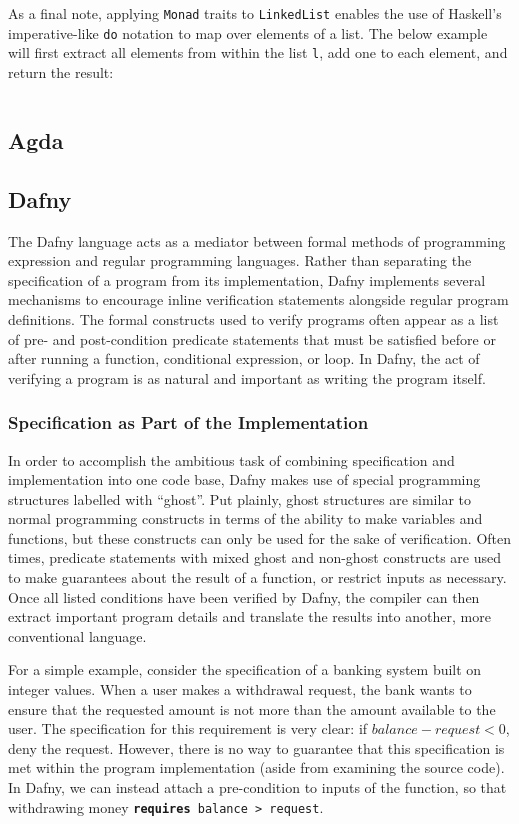 \documentclass{article}
\begin{document}
As a final note, applying \texttt{Monad} traits to \texttt{LinkedList} enables the use of Haskell's imperative-like
\texttt{do} notation to map over elements of a list. The below example will first extract all elements from within
the list \texttt{l}, add one to each element, and return the result:
\inputminted{haskell}{linked_list/main_2.hs}


\subsection{Agda}

\subsection{Dafny}

The Dafny language acts as a mediator between formal methods of programming expression and regular programming languages.
Rather than separating the specification of a program from its implementation, Dafny implements several mechanisms
to encourage inline verification statements alongside regular program definitions. The formal constructs used
to verify programs often appear as a list of pre- and post-condition
predicate statements that must be satisfied before or after running a function, conditional expression, or loop.
In Dafny, the act of verifying a program is as natural and important as writing the program itself.

\subsubsection{Specification as Part of the Implementation}

In order to accomplish the ambitious task of combining specification and implementation into one code base,
Dafny makes use of special programming structures labelled with ``ghost''. Put plainly, ghost structures are similar
to normal programming constructs in terms of the ability to make variables and functions, but these constructs
can only be used for the sake of verification. Often times, predicate statements with mixed ghost and non-ghost constructs
are used to make guarantees about the result
of a function, or restrict inputs as necessary. Once all listed conditions have been verified by Dafny,
the compiler can then extract important program details
and translate the results into another, more conventional language.

For a simple example, consider the specification of a banking system built on integer values.
When a user makes a withdrawal request, the bank wants to ensure that the requested amount is not more
than the amount available to the user. The specification for this requirement is very clear:
if $balance - request < 0$, deny the request. However, there is no way to guarantee that this specification is met
within the program implementation (aside from examining the source code). In Dafny, we can instead
attach a pre-condition to inputs of the function, so that withdrawing money \texttt{\textbf{requires} balance > request}.
\end{document}
